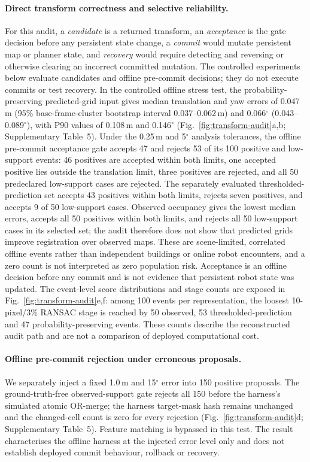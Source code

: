 \documentclass[11pt]{article}
\begin{document}
\paragraph{Direct transform correctness and selective reliability.}
For this audit, a \emph{candidate} is a returned transform, an \emph{acceptance} is the gate decision before any persistent state change, a \emph{commit} would mutate persistent map or planner state, and \emph{recovery} would require detecting and reversing or otherwise clearing an incorrect committed mutation. The controlled experiments below evaluate candidates and offline pre-commit decisions; they do not execute commits or test recovery.
In the controlled offline stress test, the probability-preserving predicted-grid input gives median translation and yaw errors of 0.047\,m (95\% base-frame-cluster bootstrap interval 0.037--0.062\,m) and 0.066$^{\circ}$ (0.043--0.089$^{\circ}$), with P90 values of 0.108\,m and 0.146$^{\circ}$ (Fig.~\ref{fig:transform-audit}a,b; Supplementary Table~5). Under the 0.25\,m and 5$^{\circ}$ analysis tolerances, the offline pre-commit acceptance gate accepts 47 and rejects 53 of its 100 positive and \mbox{low-support} events: 46 positives are accepted within both limits, one accepted positive lies outside the translation limit, three positives are rejected, and all 50 predeclared \mbox{low-support} cases are rejected. The separately evaluated thresholded-prediction set accepts 43 positives within both limits, rejects seven positives, and accepts 9 of 50 \mbox{low-support} cases. Observed occupancy gives the lowest median errors, accepts all 50 positives within both limits, and rejects all 50 \mbox{low-support} cases in its selected set; the audit therefore does not show that predicted grids improve registration over observed maps. These are scene-limited, correlated offline events rather than independent buildings or online robot encounters, and a zero count is not interpreted as zero population risk. Acceptance is an offline decision before any commit and is not evidence that persistent robot state was updated.
The event-level score distributions and stage counts are exposed in Fig.~\ref{fig:transform-audit}e,f: among 100 events per representation, the loosest 10-pixel/3\% RANSAC stage is reached by 50 observed, 53 thresholded-prediction and 47 probability-preserving events. These counts describe the reconstructed audit path and are not a comparison of deployed computational cost.

\paragraph{Offline pre-commit rejection under erroneous proposals.}
We separately inject a fixed 1.0\,m and 15$^{\circ}$ error into 150 positive proposals. The ground-truth-free observed-support gate rejects all 150 before the harness's simulated atomic OR-merge; the harness target-mask hash remains unchanged and the changed-cell count is zero for every rejection (Fig.~\ref{fig:transform-audit}d; Supplementary Table~5). Feature matching is bypassed in this test. The result characterises the offline harness at the injected error level only and does not establish deployed commit behaviour, rollback or recovery.
\end{document}
